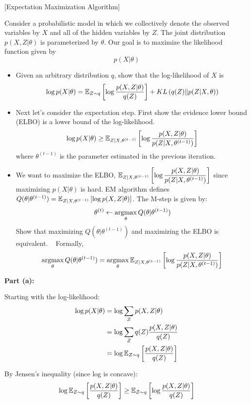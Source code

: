 \item {} [Expectation Maximization Algorithm]

Consider a probabilistic model in which we collectively denote the observed variables by $X$ and all of the hidden variables by $Z$. The joint distribution $p(X,Z|\theta)$ is parameterized by $\theta$. Our goal is to maximize the likelihood function given by
$$p(X|\theta)$$

\begin{itemize}
\item[(a)] Given an arbitrary distribution $q$, show that the log-likelihood of $X$ is~
$$\log p(X|\theta) = \mathbb{E}_{Z\sim q}\left [\log\dfrac{p(X, Z|\theta)}{q(Z)}\right] + KL\left(q(Z)\| p(Z|X,\theta)\right)$$

\item[(b)] Next let's consider the expectation step. First show the evidence lower bound (ELBO) is a lower bound of the log-likelihood. ~
$$\log p(X|\theta)\geq\mathbb{E}_{Z|X,\theta^{(t-1)}}\left[\log\dfrac{p(X,Z|\theta)}{p(Z|X,\theta^{(t-1)})}\right]$$
where $\theta^{(t-1)}$ is the parameter estimated in the previous iteration.

\item[(c)] We want to maximize the ELBO, $\mathbb{E}_{Z|X,\theta^{(t-1)}}\left[\log \dfrac{p(X,Z|\theta)}{p(Z|X,\theta^{(t-1)})}\right]$ since maximizing $p(X|\theta)$ is hard. EM algorithm defines $Q(\theta|\theta^{(t-1)}) = \mathbb{E}_{Z|X,\theta^{(t-1)}}\left[ \log p(X,Z|\theta) \right]$. The M-step is given by:
$$\theta^{(t)} \leftarrow \mathop{\rm argmax}_{\theta} Q(\theta|\theta^{(t-1)})$$
Show that maximizing $Q(\theta|\theta^{(t-1)})$ and maximizing the ELBO is equivalent. ~ Formally,
$$\mathop{\rm argmax}_{\theta} Q(\theta|\theta^{(t-1)}) = \mathop{\rm argmax}_{\theta} \mathbb{E}_{Z|X,\theta^{(t-1)}}\left[\log \dfrac{p(X,Z|\theta)}{p(Z|X,\theta^{(t-1)})}\right]$$
\end{itemize}


\solution

\textbf{Part (a):} 

Starting with the log-likelihood:
\begin{align}
\log p(X|\theta) &= \log \sum_Z p(X,Z|\theta)\\
&= \log \sum_Z q(Z) \frac{p(X,Z|\theta)}{q(Z)}\\
&= \log \mathbb{E}_{Z \sim q}\left[\frac{p(X,Z|\theta)}{q(Z)}\right]
\end{align}

By Jensen's inequality (since log is concave):
$$\log \mathbb{E}_{Z \sim q}\left[\frac{p(X,Z|\theta)}{q(Z)}\right] \geq \mathbb{E}_{Z \sim q}\left[\log \frac{p(X,Z|\theta)}{q(Z)}\right]$$

